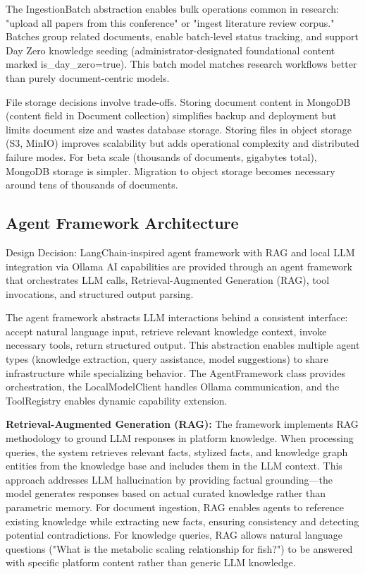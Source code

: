 \documentclass[12pt,a4paper]{article}
\begin{document}
The IngestionBatch abstraction enables bulk operations common in research: "upload all papers from this conference" or "ingest literature review corpus." Batches group related documents, enable batch-level status tracking, and support Day Zero knowledge seeding (administrator-designated foundational content marked is\_day\_zero=true). This batch model matches research workflows better than purely document-centric models.

File storage decisions involve trade-offs. Storing document content in MongoDB (content field in Document collection) simplifies backup and deployment but limits document size and wastes database storage. Storing files in object storage (S3, MinIO) improves scalability but adds operational complexity and distributed failure modes. For beta scale (thousands of documents, gigabytes total), MongoDB storage is simpler. Migration to object storage becomes necessary around tens of thousands of documents.

\subsection{Agent Framework Architecture}

\begin{rationale}{Design Decision: LangChain-inspired agent framework with RAG and local LLM integration via Ollama}
AI capabilities are provided through an agent framework that orchestrates LLM calls, Retrieval-Augmented Generation (RAG), tool invocations, and structured output parsing.
\end{rationale}

The agent framework abstracts LLM interactions behind a consistent interface: accept natural language input, retrieve relevant knowledge context, invoke necessary tools, return structured output. This abstraction enables multiple agent types (knowledge extraction, query assistance, model suggestions) to share infrastructure while specializing behavior. The AgentFramework class provides orchestration, the LocalModelClient handles Ollama communication, and the ToolRegistry enables dynamic capability extension.

\textbf{Retrieval-Augmented Generation (RAG):} The framework implements RAG methodology to ground LLM responses in platform knowledge. When processing queries, the system retrieves relevant facts, stylized facts, and knowledge graph entities from the knowledge base and includes them in the LLM context. This approach addresses LLM hallucination by providing factual grounding—the model generates responses based on actual curated knowledge rather than parametric memory. For document ingestion, RAG enables agents to reference existing knowledge while extracting new facts, ensuring consistency and detecting potential contradictions. For knowledge queries, RAG allows natural language questions ("What is the metabolic scaling relationship for fish?") to be answered with specific platform content rather than generic LLM knowledge.
\end{document}
